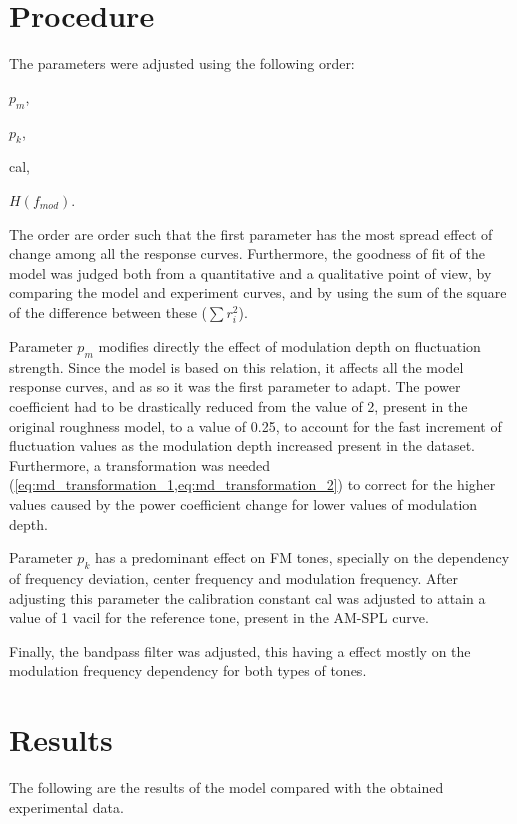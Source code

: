 \documentclass[../main.tex]{subfiles}
\begin{document}
\begin{modelchapter}
\section{Procedure}

The parameters were adjusted using the following order:
\begin{inparaenum}[(1)]
  \item $p_m$,
  \item $p_k$,
  \item cal,
  \item $H(f_{mod})$.
\end{inparaenum}
The order are order such that the first parameter has the most spread effect
of change among all the response curves. Furthermore, the goodness of fit of the
model was judged both from a quantitative and a qualitative point of view, by
comparing the model and experiment curves, and by using the sum of the square of
the difference between these ($\sum r_i^2$).

Parameter $p_m$ modifies directly the effect of modulation depth on fluctuation
strength. Since the model is based on this relation, it affects all the model
response curves, and as so it was the first parameter to adapt. The power
coefficient had to be drastically reduced from the value of 2, present in the
original roughness model, to a value of 0.25, to account for the fast increment
of fluctuation values as the modulation depth increased present in the dataset.
Furthermore, a transformation was needed
(\cref{eq:md_transformation_1,eq:md_transformation_2}) to correct for the higher
values caused by the power coefficient change for lower values of
modulation depth.

Parameter $p_k$ has a predominant effect on \gls{FM} tones, specially on the
dependency of frequency deviation, center frequency and modulation frequency.
After adjusting this parameter the calibration constant cal was adjusted to
attain a value of 1 vacil for the reference tone, present in the AM-SPL curve.

Finally, the bandpass filter was adjusted, this having a effect mostly on the
modulation frequency dependency for both types of tones.

\section{Results}

The following are the results of the model compared with the obtained
experimental data.


\end{modelchapter}
\end{document}
